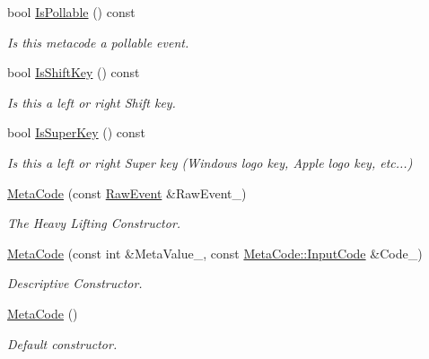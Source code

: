 \begin{DoxyCompactItemize}
bool \hyperlink{classphys_1_1MetaCode_ac8709e0a9791db4cbd0fe9f6089efd57}{IsPollable} () const 
\begin{DoxyCompactList}\small\item\em Is this metacode a pollable event. \item\end{DoxyCompactList}\item 
bool \hyperlink{classphys_1_1MetaCode_a2b2e4758229d1bba55ab47a2ca57863e}{IsShiftKey} () const 
\begin{DoxyCompactList}\small\item\em Is this a left or right Shift key. \item\end{DoxyCompactList}\item 
bool \hyperlink{classphys_1_1MetaCode_a8b63b7227b27c2be9de969c6b3a0963a}{IsSuperKey} () const 
\begin{DoxyCompactList}\small\item\em Is this a left or right Super key (Windows logo key, Apple logo key, etc...) \item\end{DoxyCompactList}\item 
\hyperlink{classphys_1_1MetaCode_ad9a618b5cc6f9d0cf0a4bc4f47bf98e8}{MetaCode} (const \hyperlink{namespacephys_a8126d26e4507e66d09876988bb941fd4}{RawEvent} \&RawEvent\_\-)
\begin{DoxyCompactList}\small\item\em The Heavy Lifting Constructor. \item\end{DoxyCompactList}\item 
\hyperlink{classphys_1_1MetaCode_a590e6b767952e278b72ff71eddf369d4}{MetaCode} (const int \&MetaValue\_\-, const \hyperlink{classphys_1_1MetaCode_a3e501cbb5bf0f6f1fdb7211465bda8d8}{MetaCode::InputCode} \&Code\_\-)
\begin{DoxyCompactList}\small\item\em Descriptive Constructor. \item\end{DoxyCompactList}\item 
\hyperlink{classphys_1_1MetaCode_ae2c80c84f924ddfd880f46ffe6a1746e}{MetaCode} ()
\begin{DoxyCompactList}\small\item\em Default constructor. \item\end{DoxyCompactList}\item 

\end{DoxyCompactItemize}

